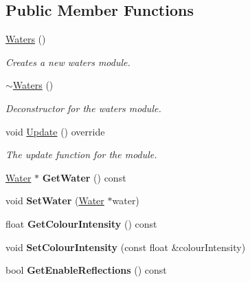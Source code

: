 \subsection*{Public Member Functions}
\begin{DoxyCompactItemize}
\item 
\hyperlink{class_flounder_1_1_waters_a1e721197ae86d5865ebda90abcb34f88}{Waters} ()
\begin{DoxyCompactList}\small\item\em Creates a new waters module. \end{DoxyCompactList}\item 
\hyperlink{class_flounder_1_1_waters_ab33b590a7bed98aa6921ddc117c59937}{$\sim$\+Waters} ()
\begin{DoxyCompactList}\small\item\em Deconstructor for the waters module. \end{DoxyCompactList}\item 
void \hyperlink{class_flounder_1_1_waters_a8f3801571babf43bce4960f7f61a94c4}{Update} () override
\begin{DoxyCompactList}\small\item\em The update function for the module. \end{DoxyCompactList}\item 
\mbox{\label{class_flounder_1_1_waters_a177bdb9dcfe1615c8642f0e2c8f30d15}} 
\hyperlink{class_flounder_1_1_water}{Water} $\ast$ {\bfseries Get\+Water} () const
\item 
\mbox{\label{class_flounder_1_1_waters_ac743d409bdef77bacd384f5c4339c56f}} 
void {\bfseries Set\+Water} (\hyperlink{class_flounder_1_1_water}{Water} $\ast$water)
\item 
\mbox{\label{class_flounder_1_1_waters_ae20a60eb0c3a8bd60a0614f1bcd56f00}} 
float {\bfseries Get\+Colour\+Intensity} () const
\item 
\mbox{\label{class_flounder_1_1_waters_a32259a8c9aed6e0dfd5e37a12ddf61df}} 
void {\bfseries Set\+Colour\+Intensity} (const float \&colour\+Intensity)
\item 
\mbox{\label{class_flounder_1_1_waters_a3711934b691704457f9d563e6664775f}} 
bool {\bfseries Get\+Enable\+Reflections} () const

\end{DoxyCompactItemize}
